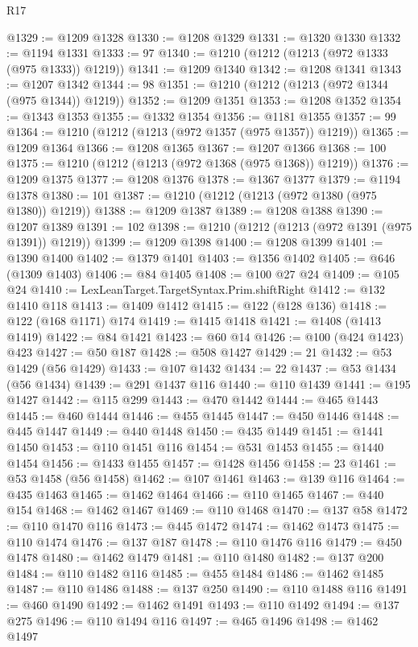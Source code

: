 \begin{lexlean}{R17}
\begin{coremodule}
{{{{{{{{{{{{{{{{{{{{{{{{{{{{{{{{{{{{{{{{{{{{{{{{{{{{{{{{{{{{{{{{{{{{{{{{{{{{{{{{{{{{{@1329 := @1209 @1328
@1330 := @1208 @1329
@1331 := @1320 @1330
@1332 := @1194 @1331
@1333 := 97
@1340 := @1210 (@1212 (@1213 (@972 @1333 (@975 @1333)) @1219))
@1341 := @1209 @1340
@1342 := @1208 @1341
@1343 := @1207 @1342
@1344 := 98
@1351 := @1210 (@1212 (@1213 (@972 @1344 (@975 @1344)) @1219))
@1352 := @1209 @1351
@1353 := @1208 @1352
@1354 := @1343 @1353
@1355 := @1332 @1354
@1356 := @1181 @1355
@1357 := 99
@1364 := @1210 (@1212 (@1213 (@972 @1357 (@975 @1357)) @1219))
@1365 := @1209 @1364
@1366 := @1208 @1365
@1367 := @1207 @1366
@1368 := 100
@1375 := @1210 (@1212 (@1213 (@972 @1368 (@975 @1368)) @1219))
@1376 := @1209 @1375
@1377 := @1208 @1376
@1378 := @1367 @1377
@1379 := @1194 @1378
@1380 := 101
@1387 := @1210 (@1212 (@1213 (@972 @1380 (@975 @1380)) @1219))
@1388 := @1209 @1387
@1389 := @1208 @1388
@1390 := @1207 @1389
@1391 := 102
@1398 := @1210 (@1212 (@1213 (@972 @1391 (@975 @1391)) @1219))
@1399 := @1209 @1398
@1400 := @1208 @1399
@1401 := @1390 @1400
@1402 := @1379 @1401
@1403 := @1356 @1402
@1405 := @646 (@1309 @1403)
@1406 := @84 @1405
@1408 := @100 @27 @24
@1409 := @105 @24
@1410 := LexLeanTarget.TargetSyntax.Prim.shiftRight
@1412 := @132 @1410 @118
@1413 := @1409 @1412
@1415 := @122 (@128 @136)
@1418 := @122 (@168 @1171) @174
@1419 := @1415 @1418
@1421 := @1408 (@1413 @1419)
@1422 := @84 @1421
@1423 := @60 @14
@1426 := @100 (@424 @1423) @423
@1427 := @50 @187
@1428 := @508 @1427
@1429 := 21
@1432 := @53 @1429 (@56 @1429)
@1433 := @107 @1432
@1434 := 22
@1437 := @53 @1434 (@56 @1434)
@1439 := @291 @1437 @116
@1440 := @110 @1439
@1441 := @195 @1427
@1442 := @115 @299
@1443 := @470 @1442
@1444 := @465 @1443
@1445 := @460 @1444
@1446 := @455 @1445
@1447 := @450 @1446
@1448 := @445 @1447
@1449 := @440 @1448
@1450 := @435 @1449
@1451 := @1441 @1450
@1453 := @110 @1451 @116
@1454 := @531 @1453
@1455 := @1440 @1454
@1456 := @1433 @1455
@1457 := @1428 @1456
@1458 := 23
@1461 := @53 @1458 (@56 @1458)
@1462 := @107 @1461
@1463 := @139 @116
@1464 := @435 @1463
@1465 := @1462 @1464
@1466 := @110 @1465
@1467 := @440 @154
@1468 := @1462 @1467
@1469 := @110 @1468
@1470 := @137 @58
@1472 := @110 @1470 @116
@1473 := @445 @1472
@1474 := @1462 @1473
@1475 := @110 @1474
@1476 := @137 @187
@1478 := @110 @1476 @116
@1479 := @450 @1478
@1480 := @1462 @1479
@1481 := @110 @1480
@1482 := @137 @200
@1484 := @110 @1482 @116
@1485 := @455 @1484
@1486 := @1462 @1485
@1487 := @110 @1486
@1488 := @137 @250
@1490 := @110 @1488 @116
@1491 := @460 @1490
@1492 := @1462 @1491
@1493 := @110 @1492
@1494 := @137 @275
@1496 := @110 @1494 @116
@1497 := @465 @1496
@1498 := @1462 @1497
}}}}}}}}}}}}}}}}}}}}}}}}}}}}}}}}}}}}}}}}}}}}}}}}}}}}}}}}}}}}}}}}}}}}}}}}}}}}}}}}}}}}}
\end{coremodule}
\end{lexlean}
